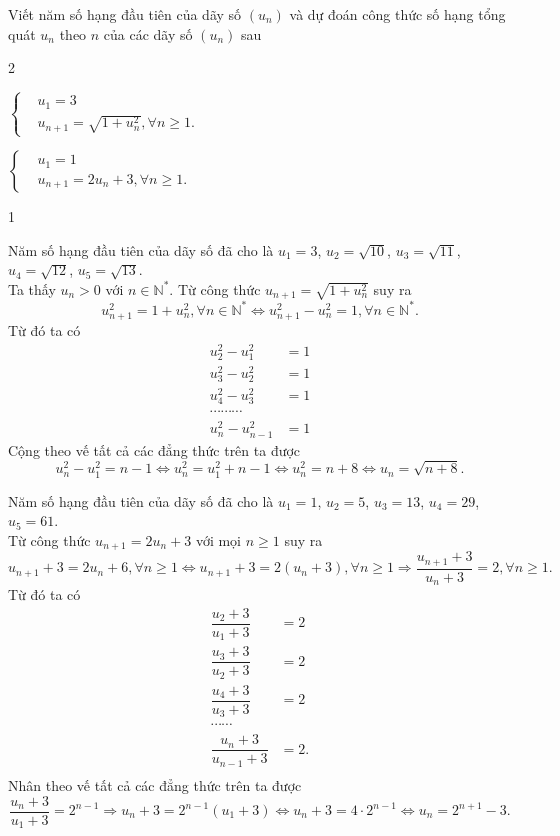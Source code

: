 \begin{bt}
	Viết năm số hạng đầu tiên của dãy số $(u_n)$ và dự đoán công thức số hạng tổng quát $u_n$ theo $n$ của các dãy số $(u_n)$ sau
	\begin{enumEX}{2}
		\item $\left\{\begin{aligned}&u_1=3 \\&u_{n+1}=\sqrt{1+u_n^2}, \forall n\geq 1.\end{aligned}\right.$	
		\item $\left\{\begin{aligned}&u_1=1 \\&u_{n+1}=2u_n+3, \forall n\geq 1.\end{aligned}\right.$	
	\end{enumEX}
	\loigiai
	{
		\begin{enumEX}{1}
			\item Năm số hạng đầu tiên của dãy số đã cho là $u_1=3$, $u_2=\sqrt{10}$, $u_3=\sqrt{11}$, $u_4=\sqrt{12}$, $u_5=\sqrt{13}$.\\
			Ta thấy $u_n>0$ với $n\in\mathbb{N}^*$. Từ công thức $u_{n+1}=\sqrt{1+u_n^2}$ suy ra
			\[u_{n+1}^2=1+u_n^2, \forall n\in \mathbb{N}^* \Leftrightarrow u_{n+1}^2-u_n^2=1, \forall n\in \mathbb{N}^*.\]
			Từ đó ta có
			\allowdisplaybreaks
			\begin{align*}
				u_2^2-u_1^2 &=1\\
				u_3^2-u_2^2 &=1\\
				u_4^2-u_3^2 &=1\\
				\cdots\cdots\cdots\\
				u_n^2-u_{n-1}^2 &=1
			\end{align*}
			Cộng theo vế tất cả các đẳng thức trên ta được
			\[u_n^2-u_1^2= n-1 \Leftrightarrow u_n^2=u_1^2+n-1 \Leftrightarrow u_n^2=n+8 \Leftrightarrow u_n=\sqrt{n+8}.\]
			\item Năm số hạng đầu tiên của dãy số đã cho là $u_1=1$, $u_2=5$, $u_3=13$, $u_4=29$, $u_5=61$.\\
			Từ công thức $u_{n+1}=2u_n+3$ với mọi $n\geq 1$ suy ra
			\[u_{n+1}+3=2u_n+6, \forall n\geq 1 \Leftrightarrow u_{n+1}+3=2(u_n+3), \forall n\geq 1 \Rightarrow \dfrac{u_{n+1}+3}{u_n+3}=2, \forall n\geq 1.\]
			Từ đó ta có
			\allowdisplaybreaks
			\begin{align*}
				\dfrac{u_2+3}{u_1+3} &=2\\
				\dfrac{u_3+3}{u_2+3} &=2\\
				\dfrac{u_4+3}{u_3+3} &=2\\
				\cdots\cdots\\
				\dfrac{u_n+3}{u_{n-1}+3} &=2.\\
			\end{align*}
			Nhân theo vế tất cả các đẳng thức trên ta được
			\[\dfrac{u_n+3}{u_1+3} = 2^{n-1} \Rightarrow u_n+3=2^{n-1}(u_1+3) \Leftrightarrow u_n+3=4\cdot 2^{n-1} \Leftrightarrow u_n=2^{n+1}-3.\]
		\end{enumEX}
	}
\end{bt}


